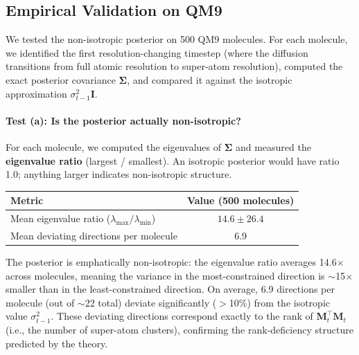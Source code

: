 \documentclass[12pt,a4paper]{article}
\begin{document}
\begin{center}
\end{center}

\subsection{Empirical Validation on QM9}

We tested the non-isotropic posterior on 500 QM9 molecules. For each molecule, we identified the first resolution-changing timestep (where the diffusion transitions from full atomic resolution to super-atom resolution), computed the exact posterior covariance $\bm{\Sigma}$, and compared it against the isotropic approximation $\sigma_{t-1}^2 \bm{I}$.

\paragraph{Test (a): Is the posterior actually non-isotropic?}
For each molecule, we computed the eigenvalues of $\bm{\Sigma}$ and measured the \textbf{eigenvalue ratio} (largest / smallest). An isotropic posterior would have ratio 1.0; anything larger indicates non-isotropic structure.

\begin{validationbox}
\begin{center}
\begin{tabular}{lc}
\toprule
\textbf{Metric} & \textbf{Value (500 molecules)} \\
\midrule
Mean eigenvalue ratio ($\lambda_{\max}/\lambda_{\min}$) & $14.6 \pm 26.4$ \\
Mean deviating directions per molecule & 6.9 \\
\bottomrule
\end{tabular}
\end{center}
The posterior is emphatically non-isotropic: the eigenvalue ratio averages 14.6$\times$ across molecules, meaning the variance in the most-constrained direction is $\sim$15$\times$ smaller than in the least-constrained direction. On average, 6.9 directions per molecule (out of $\sim$22 total) deviate significantly ($>$10\%) from the isotropic value $\sigma_{t-1}^2$. These deviating directions correspond exactly to the rank of $\bm{M}_t^\top \bm{M}_t$ (i.e., the number of super-atom clusters), confirming the rank-deficiency structure predicted by the theory.
\end{validationbox}
\end{document}
